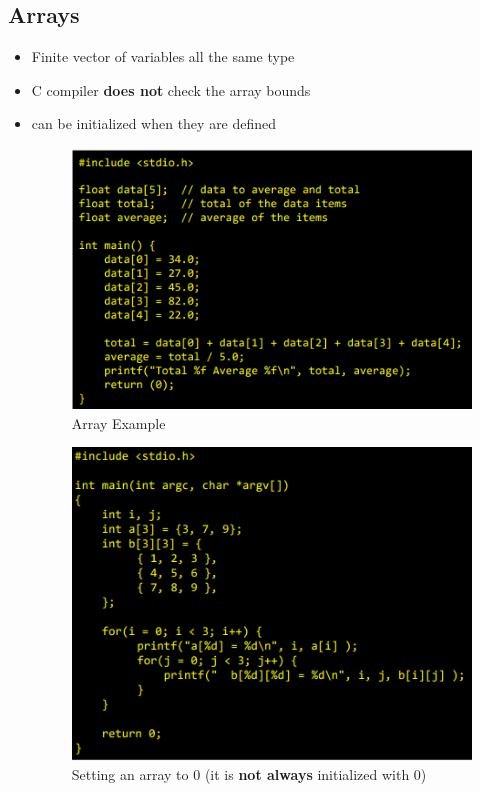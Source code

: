 \documentclass[a4paper,10pt]{article}
\begin{document}
\subsection{Arrays}
\begin{itemize}
    \item Finite vector of variables all the same type
    \item C compiler \textbf{does not} check the array bounds
    \item can be initialized when they are defined
    \begin{figure}[h!]
        \centering
        \includegraphics[width=0.75\linewidth]{Pictures/e14.png}
        \caption{Array Example}
        \label{fig:enter-label}
    \end{figure}
    \begin{figure}[h!]
        \centering
        \includegraphics[width=0.75\linewidth]{Pictures/e15.png}
        \caption{Setting an array to 0 (it is \textbf{not always} initialized with 0)}
        \label{fig:enter-label}
    \end{figure}
\end{itemize}
\end{document}
